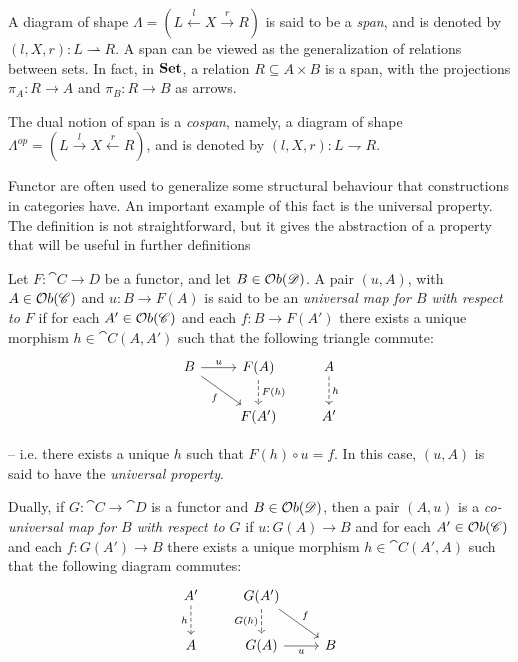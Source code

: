 \begin{example}\label{ex: span}
    A diagram of shape $\Lambda = (L \xleftarrow{l} X \xrightarrow{r} R)$ is said to be a \emph{span}, and is denoted by $(l, X, r): L \rightharpoonup R$.
    A span can be viewed as the generalization of relations between sets. In fact, in $\mathbf{Set}$, a relation $R \subseteq A \times B$ is a span, with the projections $\pi_A : R \rightarrow A$ and $\pi_B : R \rightarrow B$ as arrows.
    
    The dual notion of span is a \emph{cospan}, namely, a diagram of shape $\Lambda^{op} = (L \xrightarrow{l} X \xleftarrow{r} R)$, and is denoted by $(l, X, r): L \rightharpoondown R$.
\end{example}

Functor are often used to generalize some structural behaviour that constructions in categories have. An important example of this fact is the universal property. The definition is not straightforward, but it gives the abstraction of a property that will be useful in further definitions%

\begin{definition}\label{def:univ_prop}
    Let $F: \cat{C \rightarrow D}$ be a functor, and let $B \in \mathcal{O}b(\mathscr{D})$. A pair $(u, A)$, with $A \in \mathcal{O}b(\mathscr{C})$ and $u: B \rightarrow F(A)$ is said to be an \emph{universal map for $B$ with respect to $F$} if for each $A' \in \mathcal{O}b(\mathscr{C})$ and each $f: B \rightarrow F(A')$ there exists a unique morphism $h \in \cat C(A, A')$ such that the following triangle commute:
    \[
        \begin{tikzcd}
            B \arrow[r, "u"] \arrow[dr, "f" swap] & F(A) \arrow[d, dashed, "F(h)"] & A \arrow[d, dashed, "h"]\\
            & F(A') & A'
        \end{tikzcd}
    \]

    -- i.e. there exists a unique $h$ such that $F(h) \circ u = f$. In this case, $(u, A)$ is said to have the \emph{universal property}.

    Dually, if $G: \cat C \rightarrow \cat D$ is a functor and $B \in \mathcal{O}b(\mathscr{D})$, then a pair $(A, u)$ is a \emph{co-universal map for $B$ with respect to $G$} if $u:G(A) \rightarrow B$ and for each $A' \in \mathcal{O}b(\mathscr{C})$ and each $f: G(A') \rightarrow B$ there exists a unique morphism $h \in \cat{C}(A', A)$ such that the following diagram commutes:
    \[
        \begin{tikzcd}
            A' \arrow[d, dashed, "h" swap] & G(A') \arrow[d, dashed, "G(h)" swap] \arrow[dr, "f"] \\
            A & G(A) \arrow[r, "u" swap] & B
        \end{tikzcd}
    \]
\end{definition}


